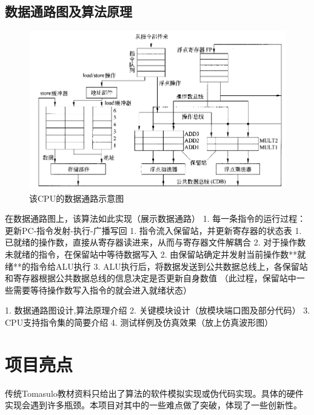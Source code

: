 \documentclass[twoside]{article}
\begin{document}
\subsection{数据通路图及算法原理}
\begin{figure}[htp]
    \centering
    \includegraphics[width=13cm]{"./figure/dataPathDiagram.png"}       
    \caption{该CPU的数据通路示意图}
    \label{fig:dataPathDiagram}
\end{figure}

在数据通路图上，该算法如此实现（展示数据通路）
  1. 每一条指令的运行过程：更新PC-指令发射-执行-广播写回
  1. 指令流入保留站，并更新寄存器的状态表
      1. 已就绪的操作数，直接从寄存器读进来，从而与寄存器文件解耦合
      2. 对于操作数未就绪的指令，在保留站中等待数据写入
  2. 由保留站确定并发射当前操作数**就绪**的指令给ALU执行
  3. ALU执行后，将数据发送到公共数据总线上，各保留站和寄存器根据公共数据总线的信息决定是否更新自身数值
  （此过程，保留站中一些需要等待操作数写入指令的就会进入就绪状态）

1. 数据通路图设计,算法原理介绍\label{algo:tomasulo}
2. 关键模块设计（放模块端口图及部分代码）
3. CPU支持指令集的简要介绍
4. 测试样例及仿真效果（放上仿真波形图）




\section{项目亮点}
传统Tomasulo教材资料只给出了算法的软件模拟实现或伪代码实现。具体的硬件实现会遇到许多瓶颈。本项目对其中的一些难点做了突破，体现了一些创新性。
\end{document}
